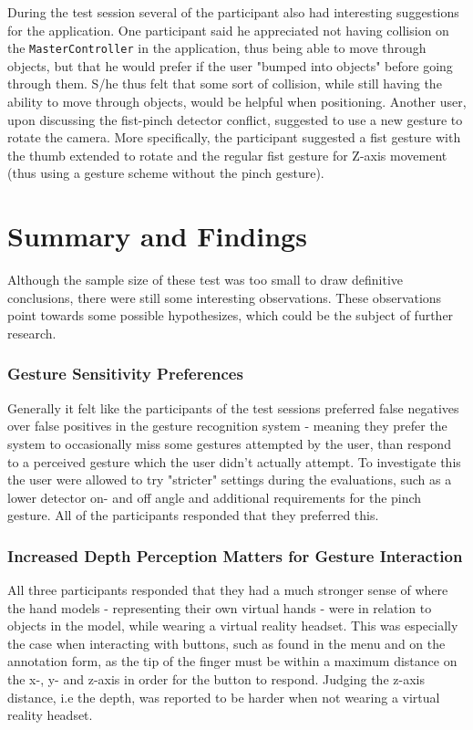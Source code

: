 During the test session several of the participant also had interesting suggestions for the application.
One participant said he appreciated not having collision on the \texttt{MasterController} in the application, thus being able to move through objects, 
but that he would prefer if the user "bumped into objects" before going through them. S/he thus felt that some sort of collision, while still having the ability to move
through objects, would be helpful when positioning. 
Another user, upon discussing the fist-pinch detector conflict, suggested to use a new gesture to rotate the camera. 
More specifically, the participant suggested a fist gesture with the thumb extended to rotate and the regular fist gesture for Z-axis movement (thus using a gesture
scheme without the pinch gesture).




\section{Summary and Findings}
Although the sample size of these test was too small to draw definitive conclusions, there were still some interesting observations.
These observations point towards some possible hypothesizes, which could be the subject of further research.

\subsubsection{Gesture Sensitivity Preferences}
Generally it felt like the participants of the test sessions preferred false negatives over false positives in the gesture recognition system -
meaning they prefer the system to occasionally miss some gestures attempted by the user, than respond to a perceived gesture which the user didn't actually attempt.
To investigate this the user were allowed to try "stricter" settings during the evaluations, such as a lower detector on- and off angle and additional requirements for the 
pinch gesture. All of the participants responded that they preferred this.

\subsubsection{Increased Depth Perception Matters for Gesture Interaction}
All three participants responded that they had a much stronger sense of where the hand models - representing their own virtual hands - were in relation to objects in the model,
while wearing a virtual reality headset. This was especially the case when interacting with buttons, such as found in the menu and on the annotation form, as the tip of the finger
must be within a maximum distance on the x-, y- and z-axis in order for the button to respond. Judging the z-axis distance, i.e the depth, was reported to be harder 
when not wearing a virtual reality headset.  


